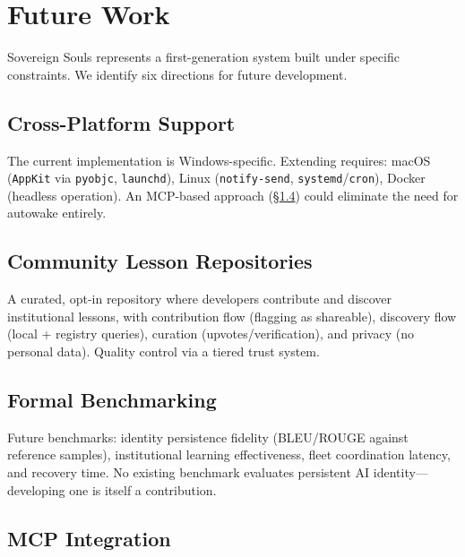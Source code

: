 \documentclass[11pt,a4paper]{article}
\begin{document}

\section{Future Work}
\label{sec:future}

Sovereign Souls represents a first-generation system built under specific constraints. We identify six directions for future development.


\subsection{Cross-Platform Support}
\label{sec:cross-platform}

The current implementation is Windows-specific. Extending requires: macOS (\texttt{AppKit} via \texttt{pyobjc}, \texttt{launchd}), Linux (\texttt{notify-send}, \texttt{systemd}/\texttt{cron}), Docker (headless operation). An MCP-based approach (\S\ref{sec:mcp}) could eliminate the need for autowake entirely.


\subsection{Community Lesson Repositories}
\label{sec:community-lessons}

A curated, opt-in repository where developers contribute and discover institutional lessons, with contribution flow (flagging as shareable), discovery flow (local + registry queries), curation (upvotes/verification), and privacy (no personal data). Quality control via a tiered trust system.


\subsection{Formal Benchmarking}
\label{sec:formal-benchmarks}

Future benchmarks: identity persistence fidelity (BLEU/ROUGE against reference samples), institutional learning effectiveness, fleet coordination latency, and recovery time. No existing benchmark evaluates persistent AI identity---developing one is itself a contribution.


\subsection{MCP Integration}
\label{sec:mcp}
\end{document}

